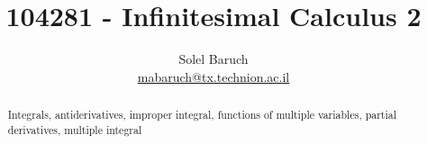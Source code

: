\documentclass[]{article}
\title{104281 - Infinitesimal Calculus 2}
\author{Solel Baruch\\  \href{mailto:mabaruch@tx.technion.ac.il}{mabaruch@tx.technion.ac.il}}
\begin{document}
	
	\maketitle
	
	\begin{abstract}
		Integrals, antiderivatives, improper integral, functions of multiple variables, partial derivatives, multiple integral
	\end{abstract}
	\tableofcontents
	
	
	
	
	
	
	
	
	
	
	
	
	
	
	
	
	
	
	
	
	
	
	
	
	
	
	
	
	
\end{document}
